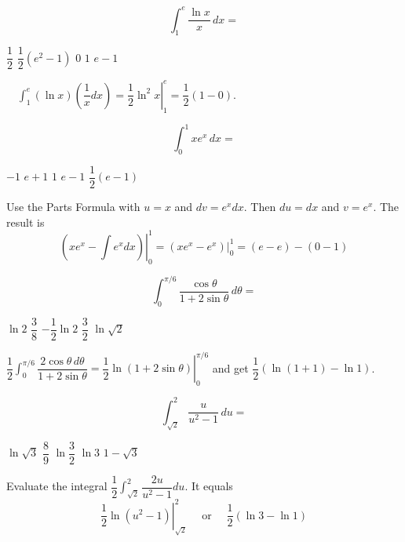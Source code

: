 \question
\[
\int_{1}^{e} \dfrac{\ln x}{x}\,dx=
\]
\begin{choices}
  \CorrectChoice $\dfrac{1}{2}$
  \choice $\dfrac{1}{2}\left(e^{2}-1\right)$
  \choice $0$
  \choice $1$
  \choice $e-1$
\end{choices}
\begin{solution}
$\quad \int_{1}^{e}(\ln x)\left(\dfrac{1}{x} d x\right)=\left.\dfrac{1}{2} \ln ^{2} x\right|_{1} ^{e}=\dfrac{1}{2}(1-0)$.
\end{solution}

\question
\[
\int_{0}^{1} x e^{x}\,dx=
\]
\begin{choices}
  \choice $-1$
  \choice $e+1$
  \CorrectChoice $1$
  \choice $e-1$
  \choice $\dfrac{1}{2}(e-1)$
\end{choices}
\begin{solution}
Use the Parts Formula with $u=x$ and $d v=e^{x} d x$. Then $d u=d x$ and $v=e^{x}$. The result is
\[
\left.\left(x e^{x}-\int e^{x} d x\right)\right|_{0} ^{1}=\left.\left(x e^{x}-e^{x}\right)\right|_{0} ^{1}=(e-e)-(0-1)
\]
\end{solution}




\newpage




\question
\[
\int_{0}^{\pi / 6} \dfrac{\cos \theta}{1+2 \sin \theta}\,d\theta=
\]
\begin{choices}
  \choice $\ln 2$
  \choice $\dfrac{3}{8}$
  \choice $-\dfrac{1}{2} \ln 2$
  \choice $\dfrac{3}{2}$
  \CorrectChoice $\ln \sqrt{2}$
\end{choices}
\begin{solution}
$\dfrac{1}{2} \int_{0}^{\pi / 6} \dfrac{2 \cos \theta\,d\theta}{1+2 \sin \theta}=\left.\dfrac{1}{2} \ln (1+2 \sin \theta)\right|_{0} ^{\pi / 6}$ and get $\dfrac{1}{2}(\ln (1+1)-\ln 1)$.
\end{solution}

\question\label{calc06:u-over-u2-minus-1}
\[
\int_{\sqrt{2}}^{2} \dfrac{u}{u^{2}-1}\,du=
\]
\begin{choices}
  \CorrectChoice $\ln \sqrt{3}$
  \choice $\dfrac{8}{9}$
  \choice $\ln \dfrac{3}{2}$
  \choice $\ln 3$
  \choice $1-\sqrt{3}$
\end{choices}
\begin{solution}
Evaluate the integral $\dfrac{1}{2} \int_{\sqrt{2}}^{2} \dfrac{2 u}{u^{2}-1} d u$. It equals
\[
\left.\dfrac{1}{2} \ln \left(u^{2}-1\right)\right|_{\sqrt{2}} ^{2} \quad \text { or } \quad \dfrac{1}{2}(\ln 3-\ln 1)
\]
\end{solution}




